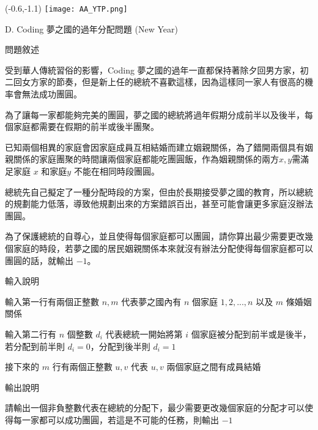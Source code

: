 \documentclass[12pt]{article}
\newcommand{\ProblemTitleFont}{\ProblemTitleMainFont\ProblemTitleCJKFont}
\newcommand{\ProblemTitle}[2]{\noindent\Large{\ProblemTitleFont #1 (#2)}\normalsize\par}
\newcommand{\ProblemSection}[1]{\vspace{0.6cm}\par\noindent\large{\ProblemTitleFont #1}\normalsize\par}
\newcommand{\ProblemStatement}{\ProblemSection{問題敘述}}
\newcommand{\ProblemInput}{\ProblemSection{輸入說明}}
\newcommand{\ProblemOutput}{\ProblemSection{輸出說明}}
\begin{document}

\begin{textblock}{0.1}(-0.6,-1.1)
	\texttt{[image: AA\_YTP.png]}
\end{textblock}




\renewcommand{\headrulewidth}{0pt}
\renewcommand{\baselinestretch}{1.3}
\setlength\parindent{24pt}
\setlength\parskip{12pt}
\cfoot{\thepage}

\ProblemTitle{D. Coding 夢之國的過年分配問題}{New Year}

\ProblemStatement

受到華人傳統習俗的影響，Coding 夢之國的過年一直都保持著除夕回男方家，初二回女方家的節奏，但是新上任的總統不喜歡這樣，因為這樣同一家人有很高的機率會無法成功團圓。

為了讓每一家都能夠完美的團圓，夢之國的總統將過年假期分成前半以及後半，每個家庭都需要在假期的前半或後半團聚。

已知兩個相異的家庭會因家庭成員互相結婚而建立姻親關係，為了錯開兩個具有姻親關係的家庭團聚的時間讓兩個家庭都能吃團圓飯，作為姻親關係的兩方$x, y$需滿足家庭 $x$ 和家庭$y$ 不能在相同時段團圓。

總統先自己擬定了一種分配時段的方案，但由於長期接受夢之國的教育，所以總統的規劃能力低落，導致他規劃出來的方案錯誤百出，甚至可能會讓更多家庭沒辦法團圓。

為了保護總統的自尊心，並且使得每個家庭都可以團圓，請你算出最少需要更改幾個家庭的時段，若夢之國的居民姻親關係本來就沒有辦法分配使得每個家庭都可以團圓的話，就輸出 $−1$。


\ProblemInput

輸入第一行有兩個正整數 $n,m$ 代表夢之國內有 $n$ 個家庭 $1,2,...,n$ 以及 $m$ 條婚姻關係

輸入第二行有 $n$ 個整數 $d_i$ 代表總統一開始將第 $i$ 個家庭被分配到前半或是後半，若分配到前半則 $d_i = 0$，分配到後半則 $d_i = 1$

接下來的 $m$ 行有兩個正整數 $u, v$ 代表 $u, v$ 兩個家庭之間有成員結婚

\clearpage

\ProblemOutput

請輸出一個非負整數代表在總統的分配下，最少需要更改幾個家庭的分配才可以使得每一家都可以成功團圓，若這是不可能的任務，則輸出 $-1$
\end{document}
